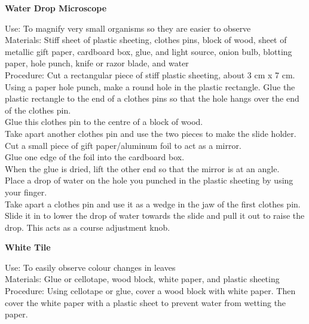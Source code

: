 \begin{flushleft}
\textbf{Water Drop Microscope}
\end{flushleft}
\vspace{-10pt}
Use: To magnify very small organisms so they are easier to observe\\
Materials: Stiff sheet of plastic sheeting, clothes pins, block of wood, sheet of metallic gift paper, cardboard box, glue, and light source, onion bulb, blotting paper, hole punch, knife or razor blade, and water\\
Procedure: Cut a rectangular piece of stiff plastic sheeting, about 3 cm x 7 cm.\\
Using a paper hole punch, make a round hole in the plastic rectangle. Glue the plastic rectangle to the end of a clothes pins so that the hole hangs over the end of the clothes pin.\\
Glue this clothes pin to the centre of a block of wood.\\
Take apart another clothes pin and use the two pieces to make the slide holder.\\
Cut a small piece of gift paper/aluminum foil to act as a mirror.\\
Glue one edge of the foil into the cardboard box.\\
When the glue is dried, lift the other end so that the mirror is at an angle.\\
Place a drop of water on the hole you punched in the plastic sheeting by using your finger.\\
Take apart a clothes pin and use it as a wedge in the jaw of the first clothes pin. Slide it in to lower the drop of water towards the slide and pull it out to raise the drop. This acts as a course adjustment knob.\\

\begin{flushleft}
\textbf{White Tile}
\end{flushleft}
\vspace{-10pt}
Use: To easily observe colour changes in leaves\\
Materials: Glue or cellotape, wood block, white paper, and plastic sheeting\\
Procedure: Using cellotape or glue, cover a wood block with white paper. Then cover the white paper with a plastic sheet to prevent water from wetting the paper.\\
